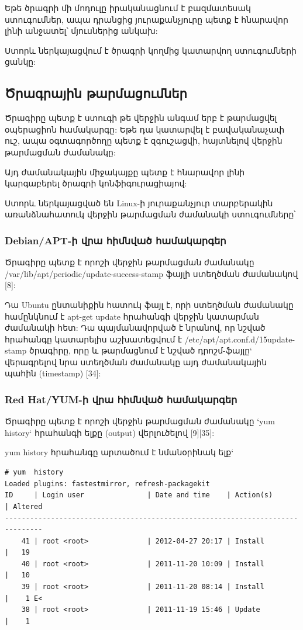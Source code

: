 \documentclass[a4paper,12pt]{article}
\begin{document}
\begin{sloppypar}
Եթե ծրագրի մի մոդուլը իրականացնում է բազմատեսակ ստուգումներ,
ապա դրանցից յուրաքանչյուրը պետք է հնարավոր լինի անջատել՝
մյուսներից անկախ:

Ստորև ներկայացվում է ծրագրի կողմից կատարվող ստուգումների ցանկը:


\subsection{Ծրագրային թարմացումներ}

Ծրագիրը պետք է ստուգի թե վերջին անգամ երբ է թարմացվել
օպերացիոն համակարգը:
Եթե դա կատարվել է բավականաչափ ուշ, ապա օգտագործողը պետք է
զգուշացվի, հայտնելով վերջին թարմացման ժամանակը:

Այդ ժամանակային միջակայքը պետք է հնարավոր լինի կարգաբերել ծրագրի կոնֆիգուրացիայով:

Ստորև ներկայացված են Linux-ի յուրաքանչյուր տարբերակին առանձնահատուկ
վերջին թարմացման ժամանակի ստուգումները՝

\subsubsection{Debian/APT-ի վրա հիմնված համակարգեր}

Ծրագիրը պետք է որոշի վերջին թարմացման ժամանակը
/var/lib/apt/periodic/update-success-stamp
ֆայլի ստեղծման ժամանակով [8]:

Դա Ubuntu ընտանիքին հատուկ ֆայլ է, որի ստեղծման ժամանակը համընկնում է
apt-get update հրահանգի վերջին կատարման ժամանակի հետ: Դա պայմանավորված է
նրանով, որ նշված հրահանգը կատարելիս աշխատեցվում է
/etc/apt/apt.conf.d/15update-stamp
ծրագիրը, որը և թարմացնում է նշված դրոշմ-ֆայլը` վերագրելով նրա
ստեղծման ժամանակը այդ ժամանակային պահին (timestamp) [34]:

\subsubsection{Red Hat/YUM-ի վրա հիմնված համակարգեր}

Ծրագիրը պետք է որոշի վերջին թարմացման ժամանակը `yum history`
հրահանգի ելքը (output) վերլուծելով [9][35]:

yum history հրահանգը արտածում է նմանօրինակ ելք`

\begin{lstlisting}[language={}]
# yum  history
Loaded plugins: fastestmirror, refresh-packagekit
ID     | Login user               | Date and time    | Action(s)      | Altered
-------------------------------------------------------------------------------
    41 | root <root>              | 2012-04-27 20:17 | Install        |   19   
    40 | root <root>              | 2011-11-20 10:09 | Install        |   10   
    39 | root <root>              | 2011-11-20 08:14 | Install        |    1 E<
    38 | root <root>              | 2011-11-19 15:46 | Update         |    1 
\end{lstlisting}



\end{sloppypar}
\end{document}
